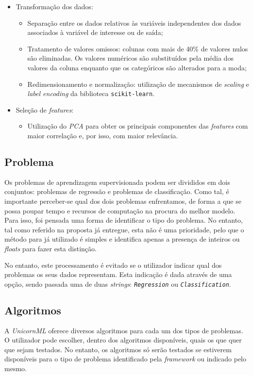 \documentclass[a4paper]{report}
\begin{document}
{		\begin{itemize}
			\item Transformação dos dados:
			\begin{itemize}
				\item Separação entre os dados relativos às variáveis independentes dos dados associados à variável de interesse ou de saída;
				\item Tratamento de valores omissos: colunas com mais de 40\% de valores nulos são eliminadas. Os valores numéricos são substituídos pela média dos valores da coluna enquanto que os categóricos são alterados para a moda;
				\item Redimensionamento e normalização: utilização de mecanismos de \textit{scaling} e \textit{label encoding} da biblioteca \texttt{scikit-learn}.
			\end{itemize}
			\item Seleção de \textit{features}:
			\begin{itemize}
				\item Utilização do \textit{PCA} para obter os principais componentes das \textit{features} com maior correlação e, por isso, com maior relevância.
			\end{itemize}
			
		\end{itemize}

		\subsection{Problema} \label{subsec:Problem}
		Os problemas de aprendizagem supervisionada podem ser divididos em dois conjuntos: problemas de regressão e problemas de classificação.
		Como tal, é importante perceber-se qual dos dois problemas enfrentamos, de forma a que se possa poupar tempo e recursos de computação na procura do melhor modelo.
		Para isso, foi pensada uma forma de identificar o tipo do problema. No entanto, tal como referido na proposta já entregue, esta não é uma prioridade,
		pelo que o método para já utilizado é simples e identifica apenas a presença de inteiros ou \textit{floats} para fazer esta distinção.

		No entanto, este processamento é evitado se o utilizador indicar qual dos problemas os seus dados representam.
		Esta indicação é dada através de uma opção, sendo passada uma de duas \textit{strings}: \textit{\texttt{Regression}} ou \textit{\texttt{Classification}}.

		\subsection{Algoritmos} \label{subsec:Algorithms}
		A \textsl{UnicornML} oferece diversos algoritmos para cada um dos tipos de problemas. 
		O utilizador pode escolher, dentro dos algoritmos disponíveis, quais os que quer que sejam testados. 
		No entanto, os algoritmos só serão testados se estiverem disponíveis para o tipo de problema identificado pela \textit{framework} ou indicado pelo mesmo.

}
\end{document}
